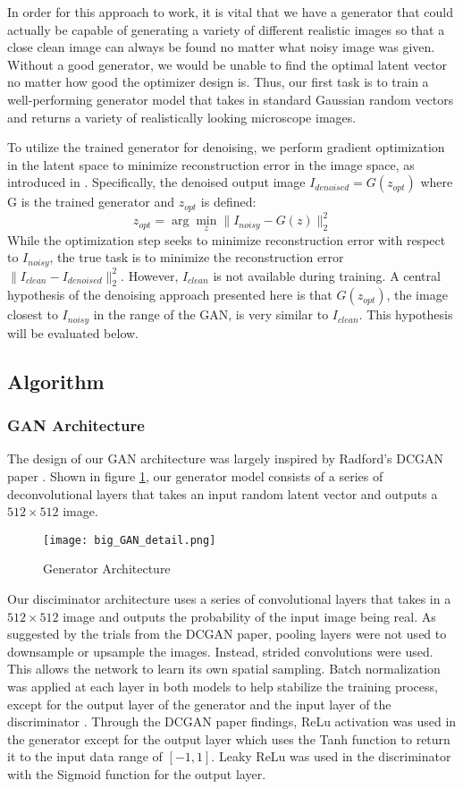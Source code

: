 \documentclass{article}
\begin{document}
In order for this approach to work, it is vital that we have a generator that could actually be capable of generating a variety of different realistic images so that a close clean image can always be found no matter what noisy image was given. Without a good generator, we would be unable to find the optimal latent vector no matter how good the optimizer design is. Thus, our first task is to train a well-performing generator model that takes in standard Gaussian random vectors and returns a variety of realistically looking microscope images.

To utilize the trained generator for denoising, we perform gradient optimization in the latent space to minimize reconstruction error in the image space, as introduced in \cite{creswell}. Specifically, the denoised output image $I_{denoised} = G(z_{opt})$ where G is the trained generator and $z_{opt}$ is defined:
\begin{equation}\label{eq:optim}
    z_{opt} = \arg\min_z \|I_{noisy} - G(z)\|_2^2
\end{equation}
While the optimization step seeks to minimize reconstruction error with respect to $I_{noisy}$, the true task is to minimize the reconstruction error $\|I_{clean} - I_{denoised}\|_2^2$. However, $I_{clean}$ is not available during training. A central hypothesis of the denoising approach presented here is that $G(z_{opt})$, the image closest to $I_{noisy}$ in the range of the GAN, is very similar to $I_{clean}$. This hypothesis will be evaluated below. 
\subsection{Algorithm}
\subsubsection{GAN Architecture}
The design of our GAN architecture was largely inspired by Radford's DCGAN paper \cite{DCGAN}. Shown in figure \ref{fig:G}, our generator model consists of a series of deconvolutional layers that takes an input random latent vector and outputs a $512\times 512$ image. 
\begin{figure}[!h]
    \centering
    \texttt{[image: big\_GAN\_detail.png]}
    \caption{Generator Architecture}
    \label{fig:G}
\end{figure}
\FloatBarrier
Our disciminator architecture uses a series of convolutional layers that takes in a $512\times 512$ image and outputs the probability of the input image being real. As suggested by the trials from the DCGAN paper, pooling layers were not used to downsample or upsample the images. Instead, strided convolutions were used. This allows the network to learn its own spatial sampling. Batch normalization was applied at each layer in both models to help stabilize the training process, except for the output layer of the generator and the input layer of the discriminator \cite{DCGAN}. Through the DCGAN paper findings, ReLu activation was used in the generator except for the output layer which uses the Tanh function to return it to the input data range of $[-1,1]$. Leaky ReLu was used in the discriminator with the Sigmoid function for the output layer. 
\end{document}
